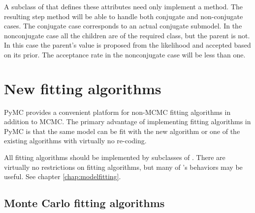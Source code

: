 A subclass of  that defines these attributes need only implement a  method. The resulting step method will be able to handle both conjugate and non-conjugate cases. The conjugate case corresponds to an actual conjugate submodel. In the nonconjugate case all the children are of the required class, but the parent is not. In this case the parent's value is proposed from the likelihood and accepted based on its prior. The acceptance rate in the nonconjugate case will be less than one.

\hypertarget{custom-model}{}
\section*{New fitting algorithms} \label{custom-model}

PyMC provides a convenient platform for non-MCMC fitting algorithms in addition to MCMC. The primary advantage of implementing fitting algorithms in PyMC is that the same model can be fit with the new algorithm or one of the existing algorithms with virtually no re-coding.

All fitting algorithms should be implemented by subclasses of . There are virtually no restrictions on fitting algorithms, but many of 's behaviors may be useful. See chapter \ref{chap:modelfitting}. 

\hypertarget{custom-MC}{}
\subsection*{Monte Carlo fitting algorithms} \label{custom-MC}

